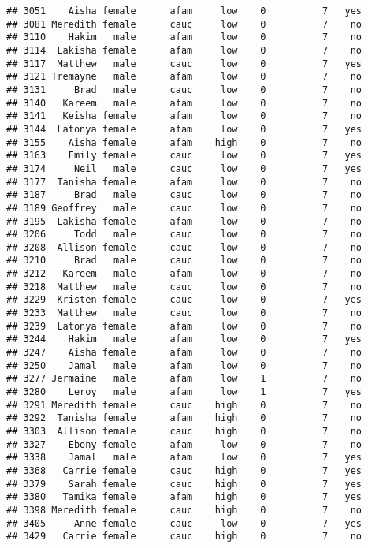 \documentclass[
]{article}
\begin{document}
\begin{verbatim}
## 3051    Aisha female      afam     low    0          7   yes
## 3081 Meredith female      cauc     low    0          7    no
## 3110    Hakim   male      afam     low    0          7    no
## 3114  Lakisha female      afam     low    0          7    no
## 3117  Matthew   male      cauc     low    0          7   yes
## 3121 Tremayne   male      afam     low    0          7    no
## 3131     Brad   male      cauc     low    0          7    no
## 3140   Kareem   male      afam     low    0          7    no
## 3141   Keisha female      afam     low    0          7    no
## 3144  Latonya female      afam     low    0          7   yes
## 3155    Aisha female      afam    high    0          7    no
## 3163    Emily female      cauc     low    0          7   yes
## 3174     Neil   male      cauc     low    0          7   yes
## 3177  Tanisha female      afam     low    0          7    no
## 3187     Brad   male      cauc     low    0          7    no
## 3189 Geoffrey   male      cauc     low    0          7    no
## 3195  Lakisha female      afam     low    0          7    no
## 3206     Todd   male      cauc     low    0          7    no
## 3208  Allison female      cauc     low    0          7    no
## 3210     Brad   male      cauc     low    0          7    no
## 3212   Kareem   male      afam     low    0          7    no
## 3218  Matthew   male      cauc     low    0          7    no
## 3229  Kristen female      cauc     low    0          7   yes
## 3233  Matthew   male      cauc     low    0          7    no
## 3239  Latonya female      afam     low    0          7    no
## 3244    Hakim   male      afam     low    0          7   yes
## 3247    Aisha female      afam     low    0          7    no
## 3250    Jamal   male      afam     low    0          7    no
## 3277 Jermaine   male      afam     low    1          7    no
## 3280    Leroy   male      afam     low    1          7   yes
## 3291 Meredith female      cauc    high    0          7    no
## 3292  Tanisha female      afam    high    0          7    no
## 3303  Allison female      cauc    high    0          7    no
## 3327    Ebony female      afam     low    0          7    no
## 3338    Jamal   male      afam     low    0          7   yes
## 3368   Carrie female      cauc    high    0          7   yes
## 3379    Sarah female      cauc    high    0          7   yes
## 3380   Tamika female      afam    high    0          7   yes
## 3398 Meredith female      cauc    high    0          7    no
## 3405     Anne female      cauc     low    0          7   yes
## 3429   Carrie female      cauc    high    0          7    no

\end{verbatim}
\end{document}
